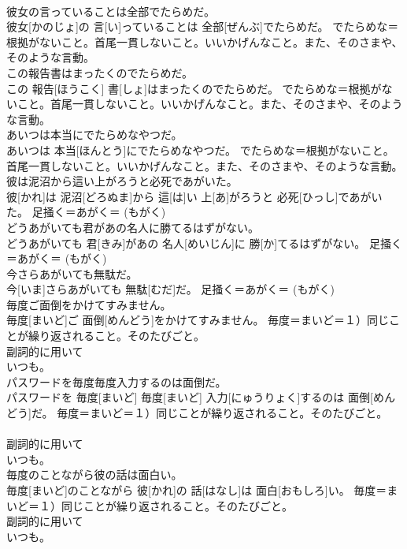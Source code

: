 \documentclass[8pt]{extreport}
\begin{document}
\begin{CJK}{UTF8}{min}
{\\	彼女の言っていることは全部でたらめだ。	
\\	彼女[かのじょ]の 言[い]っていることは 全部[ぜんぶ]でたらめだ。	でたらめな＝根拠がないこと。首尾一貫しないこと。いいかげんなこと。また、そのさまや、そのような言動。
\\	この報告書はまったくのでたらめだ。	
\\	この 報告[ほうこく] 書[しょ]はまったくのでたらめだ。	でたらめな＝根拠がないこと。首尾一貫しないこと。いいかげんなこと。また、そのさまや、そのような言動。
\\	あいつは本当にでたらめなやつだ。	
\\	あいつは 本当[ほんとう]にでたらめなやつだ。	でたらめな＝根拠がないこと。首尾一貫しないこと。いいかげんなこと。また、そのさまや、そのような言動。
\\	彼は泥沼から這い上がろうと必死であがいた。	
\\	彼[かれ]は 泥沼[どろぬま]から 這[は]い 上[あ]がろうと 必死[ひっし]であがいた。	足掻く＝あがく＝ (もがく) 
\\	どうあがいても君があの名人に勝てるはずがない。	
\\	どうあがいても 君[きみ]があの 名人[めいじん]に 勝[か]てるはずがない。	足掻く＝あがく＝ (もがく) 
\\	今さらあがいても無駄だ。	
\\	今[いま]さらあがいても 無駄[むだ]だ。	足掻く＝あがく＝ (もがく) 
\\	毎度ご面倒をかけてすみません。	
\\	毎度[まいど]ご 面倒[めんどう]をかけてすみません。	毎度＝まいど＝１）同じことが繰り返されること。そのたびごと。 　　　　　　　
\\	副詞的に用いて
\\	いつも。
\\	パスワードを毎度毎度入力するのは面倒だ。	
\\	パスワードを 毎度[まいど] 毎度[まいど] 入力[にゅうりょく]するのは 面倒[めんどう]だ。	毎度＝まいど＝１）同じことが繰り返されること。そのたびごと。 　　　　　　　
\\	副詞的に用いて
\\	いつも。
\\	毎度のことながら彼の話は面白い。	
\\	毎度[まいど]のことながら 彼[かれ]の 話[はなし]は 面白[おもしろ]い。	毎度＝まいど＝１）同じことが繰り返されること。そのたびごと。 　　　　　　　
\\	副詞的に用いて
\\	いつも。
}
\end{CJK}
\end{document}
